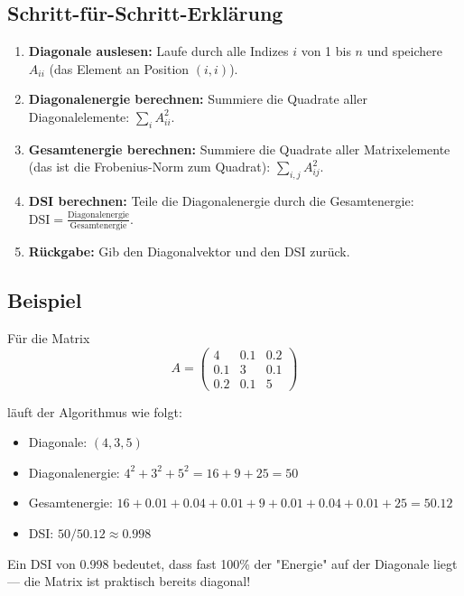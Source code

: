 \documentclass[a4paper,12pt]{article}
\begin{document}
\subsection{Schritt-für-Schritt-Erklärung}

\begin{enumerate}
\item \textbf{Diagonale auslesen:} Laufe durch alle Indizes $i$ von 1 bis $n$ und speichere $A_{ii}$ (das Element an Position $(i, i)$).

\item \textbf{Diagonalenergie berechnen:} Summiere die Quadrate aller Diagonalelemente: $\sum_i A_{ii}^2$.

\item \textbf{Gesamtenergie berechnen:} Summiere die Quadrate aller Matrixelemente (das ist die Frobenius-Norm zum Quadrat): $\sum_{i,j} A_{ij}^2$.

\item \textbf{DSI berechnen:} Teile die Diagonalenergie durch die Gesamtenergie: $\text{DSI} = \frac{\text{Diagonalenergie}}{\text{Gesamtenergie}}$.

\item \textbf{Rückgabe:} Gib den Diagonalvektor und den DSI zurück.
\end{enumerate}

\subsection{Beispiel}

Für die Matrix 
$$A = \begin{pmatrix} 4 & 0.1 & 0.2 \\ 0.1 & 3 & 0.1 \\ 0.2 & 0.1 & 5 \end{pmatrix}$$

läuft der Algorithmus wie folgt:
\begin{itemize}
\item Diagonale: $(4, 3, 5)$
\item Diagonalenergie: $4^2 + 3^2 + 5^2 = 16 + 9 + 25 = 50$
\item Gesamtenergie: $16 + 0.01 + 0.04 + 0.01 + 9 + 0.01 + 0.04 + 0.01 + 25 = 50.12$
\item DSI: $50 / 50.12 \approx 0.998$
\end{itemize}

Ein DSI von 0.998 bedeutet, dass fast 100\% der "Energie" auf der Diagonale liegt — die Matrix ist praktisch bereits diagonal!
\end{document}
